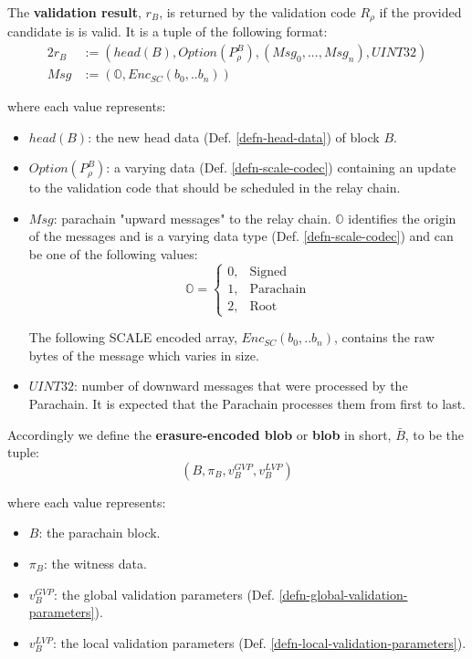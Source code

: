 \begin{definition}
  The \textbf{validation result}, $r_B$, is returned by the validation code $R_{\rho}$
  if the provided candidate is is valid. It is a tuple of the following format:
  \begin{alignat*}{2}
    r_B &:= (head(B), Option(P^B_{\rho}), (Msg_0, ..., Msg_n), UINT32) \\
    Msg &:= (\mathbb{O}, Enc_{SC}(b_0,.. b_n))
  \end{alignat*}

  where each value represents:
  \begin{itemize}
    \item $head(B)$: the new head data (Def. \ref{defn-head-data}) of
    block $B$.
    \item $Option(P^B_{\rho})$: a varying data (Def. \ref{defn-scale-codec})
    containing an update to the validation code that should be scheduled in the
    relay chain.
    \item $Msg$: parachain "upward messages" to the relay chain. $\mathbb{O}$
    identifies the origin of the messages and is a varying data type (Def.
    \ref{defn-scale-codec}) and can be one of the following values:
    \begin{equation*}
      \mathbb{O} =
      \begin{cases}
        0, & \text{Signed} \\
        1, & \text{Parachain} \\
        2, & \text{Root}
      \end{cases}
    \end{equation*}

    The following SCALE encoded array, $Enc_{SC}(b_0,.. b_n)$, contains the
    raw bytes of the message which varies in size.
    \item $UINT32$: number of downward messages that were processed by the Parachain. It
    is expected that the Parachain processes them from first to last.
  \end{itemize}
\end{definition}

\begin{definition}
  \label{defn-blob}
  Accordingly we define the {\bf erasure-encoded blob} or {\bf blob} in short,
  {\bf $\bar{B}$}, to be the tuple:
  \[
  (B, \pi_B, v^{GVP}_B, v^{LVP}_B)
  \]

  where each value represents:

  \begin{itemize}
    \item $B$: the parachain block.
    \item $\pi_B$: the witness data.
    \item $v^{GVP}_B$: the global validation parameters (Def. \ref{defn-global-validation-parameters}).
    \item $v^{LVP}_B$: the local validation parameters (Def. \ref{defn-local-validation-parameters}).
  \end{itemize}
\end{definition}

